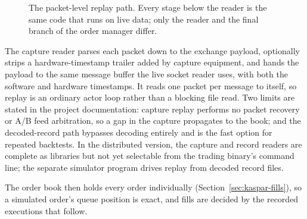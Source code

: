 \begin{figure}[ht]
\centering
{}
\caption{The packet-level replay path. Every stage below the reader is the same code that runs on
live data; only the reader and the final branch of the order manager differ.}
\label{fig:pcap}
\end{figure}

The capture reader parses each packet down to the exchange payload, optionally strips a
hardware-timestamp trailer added by capture equipment, and hands the payload to the same message
buffer the live socket reader uses, with both the software and hardware timestamps. It reads one
packet per message to itself, so replay is an ordinary actor loop rather than a blocking file read.
Two limits are stated in the project documentation: capture replay performs no packet recovery or
A/B feed arbitration, so a gap in the capture propagates to the book; and the decoded-record path
bypasses decoding entirely and is the fast option for repeated backtests. In the distributed
version, the capture and record readers are complete as libraries but not yet selectable from the
trading binary's command line; the separate simulator program drives replay from decoded record
files.

The order book then holds every order individually (Section~\ref{sec:kaspar-fills}), so a simulated
order's queue position is exact, and fills are decided by the recorded executions that follow.

